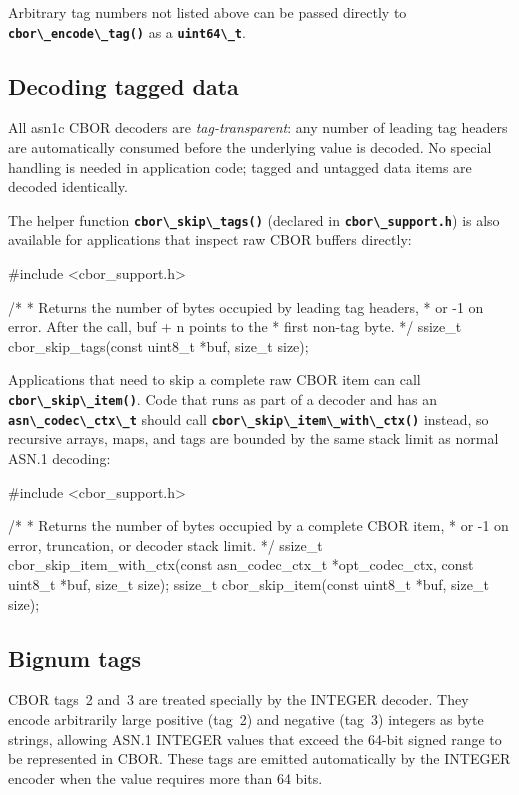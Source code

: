 \documentclass[english,oneside,12pt]{book}
\newcommand{\code}[1]{\texttt{\textbf{\lstinline{#1}}}}
\begin{document}
Arbitrary tag numbers not listed above can be passed directly to
\code{cbor\_encode\_tag()} as a \code{uint64\_t}.

\subsection*{Decoding tagged data}

All asn1c CBOR decoders are \emph{tag-transparent}: any number of leading
tag headers are automatically consumed before the underlying value is decoded.
No special handling is needed in application code; tagged and untagged data
items are decoded identically.

The helper function \code{cbor\_skip\_tags()} (declared in
\code{cbor\_support.h}) is also available for applications that inspect raw
CBOR buffers directly:

\begin{codesample}
#include <cbor_support.h>

/*
 * Returns the number of bytes occupied by leading tag headers,
 * or -1 on error.  After the call, buf + n points to the
 * first non-tag byte.
 */
ssize_t cbor_skip_tags(const uint8_t *buf, size_t size);
\end{codesample}

Applications that need to skip a complete raw CBOR item can call
\code{cbor\_skip\_item()}.  Code that runs as part of a decoder and has an
\code{asn\_codec\_ctx\_t} should call \code{cbor\_skip\_item\_with\_ctx()}
instead, so recursive arrays, maps, and tags are bounded by the same stack
limit as normal ASN.1 decoding:

\begin{codesample}
#include <cbor_support.h>

/*
 * Returns the number of bytes occupied by a complete CBOR item,
 * or -1 on error, truncation, or decoder stack limit.
 */
ssize_t cbor_skip_item_with_ctx(const asn_codec_ctx_t *opt_codec_ctx,
                                const uint8_t *buf, size_t size);
ssize_t cbor_skip_item(const uint8_t *buf, size_t size);
\end{codesample}

\subsection*{Bignum tags}

CBOR tags~2 and~3 are treated specially by the INTEGER decoder.
They encode arbitrarily large positive (tag~2) and negative (tag~3)
integers as byte strings, allowing ASN.1 INTEGER values that exceed the
64-bit signed range to be represented in CBOR.  These tags are emitted
automatically by the INTEGER encoder when the value requires more than
64 bits.
\end{document}
